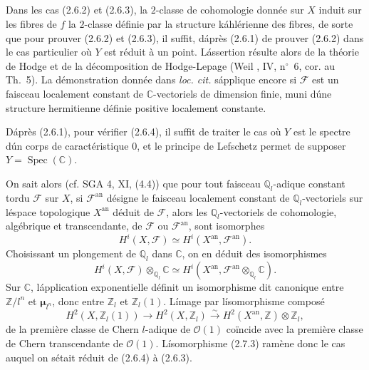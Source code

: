 \documentclass[12pt]{amsart}
\theoremstyle{plain}
\theoremstyle{remark}
\DeclareMathOperator{\Spec}{Spec}
\newcommand{\cF}{\mathscr{F}}
\newcommand{\cO}{\mathscr{O}}
\begin{document}
\subsection{}
Dans les cas (2.6.2) et (2.6.3), la $2$-classe de cohomologie donn\'ee sur $X$ induit sur les fibres de $f$ la $2$-classe d\'efinie par la structure k\'ahl\'erienne des fibres, de sorte que pour prouver (2.6.2) et (2.6.3), il suffit, d\'apr\`es (2.6.1) de prouver (2.6.2) dans le cas particulier o\`u $Y$ est r\'eduit \`a un point. L\'assertion r\'esulte alors de la th\'eorie de Hodge et de la d\'ecomposition de Hodge-Lepage (Weil \cite{Weil1}, IV, n${}^\circ$~6, cor. au Th.~5). La d\'emonstration donn\'ee dans \textit{loc. cit.} s\'applique encore si $\cF$ est un faisceau localement constant de $\mathbb{C}$-vectoriels de dimension finie, muni d\'une structure hermitienne d\'efinie positive localement constante.

D\'apr\`es (2.6.1), pour v\'erifier (2.6.4), il suffit de traiter le cas o\`u $Y$ est le spectre d\'un corps de caract\'eristique $0$, et le principe de Lefschetz permet de supposer $Y = \Spec(\mathbb{C})$.

On sait alors (cf. SGA 4, XI, (4.4)) que pour tout faisceau $\mathbb{Q}_l$-adique constant tordu $\cF$ sur $X$, si $\cF^{\text{an}}$ d\'esigne le faisceau localement constant de $\mathbb{Q}_l$-vectoriels sur l\'espace topologique $X^{\text{an}}$ d\'eduit de $\cF$, alors les $\mathbb{Q}_l$-vectoriels de cohomologie, alg\'ebrique et transcendante, de $\cF$ ou $\cF^{\text{an}}$, sont isomorphes
\begin{equation}\label{eq:2.7.2}
H^i(X, \cF) \simeq H^i(X^{\text{an}}, \cF^{\text{an}}).
\end{equation}
Choisissant un plongement de $\mathbb{Q}_l$ dans $\mathbb{C}$, on en d\'eduit des isomorphismes
\begin{equation}\label{eq:2.7.3}
H^i(X, \cF) \otimes_{\mathbb{Q}_l} \mathbb{C} \simeq H^i(X^{\text{an}}, \cF^{\text{an}} \otimes_{\mathbb{Q}_l} \mathbb{C}).
\end{equation}
Sur $\mathbb{C}$, l\'application exponentielle d\'efinit un isomorphisme dit canonique entre $\mathbb{Z}/l^n$ et $\boldsymbol{\mu}_{l^n}$, donc entre $\mathbb{Z}_l$ et $\mathbb{Z}_l(1)$. L\'image par l\'isomorphisme compos\'e
\[
H^2(X, \mathbb{Z}_l(1)) \longrightarrow H^2(X, \mathbb{Z}_l) \xrightarrow{\sim} H^2(X^{\text{an}}, \mathbb{Z}) \otimes \mathbb{Z}_l,
\]
de la premi\`ere classe de Chern $l$-adique de $\cO(1)$ co\"incide avec la premi\`ere classe de Chern transcendante de $\cO(1)$. L\'isomorphisme (2.7.3) ram\`ene donc le cas auquel on s\'etait r\'eduit de (2.6.4) \`a (2.6.3).
\end{document}
